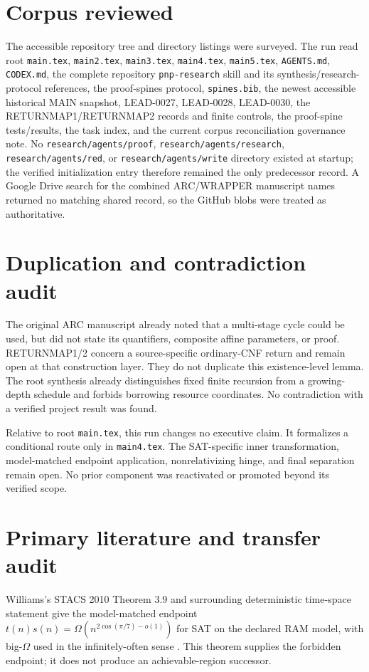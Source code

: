 \documentclass[11pt]{article}
\begin{document}
\section{Corpus reviewed}
The accessible repository tree and directory listings were surveyed. The run
read root \texttt{main.tex}, \texttt{main2.tex}, \texttt{main3.tex},
\texttt{main4.tex}, \texttt{main5.tex}, \texttt{AGENTS.md},
\texttt{CODEX.md}, the complete repository \texttt{pnp-research} skill and its
synthesis/research-protocol references, the proof-spines protocol,
\texttt{spines.bib}, the newest accessible historical MAIN snapshot,
LEAD-0027, LEAD-0028, LEAD-0030, the RETURNMAP1/RETURNMAP2 records and finite
controls, the proof-spine tests/results, the task index, and the current corpus
reconciliation governance note. No \texttt{research/agents/proof},
\texttt{research/agents/research}, \texttt{research/agents/red}, or
\texttt{research/agents/write} directory existed at startup; the verified
initialization entry therefore remained the only predecessor record. A Google
Drive search for the combined ARC/WRAPPER manuscript names returned no
matching shared record, so the GitHub blobs were treated as authoritative.

\section{Duplication and contradiction audit}
The original ARC manuscript already noted that a multi-stage cycle could be
used, but did not state its quantifiers, composite affine parameters, or proof.
RETURNMAP1/2 concern a source-specific ordinary-CNF return and remain open at
that construction layer. They do not duplicate this existence-level lemma.
The root synthesis already distinguishes fixed finite recursion from a
growing-depth schedule and forbids borrowing resource coordinates. No
contradiction with a verified project result was found.

Relative to root \texttt{main.tex}, this run changes no executive claim. It
formalizes a conditional route only in \texttt{main4.tex}. The SAT-specific
inner transformation, model-matched endpoint application, nonrelativizing
hinge, and final separation remain open. No prior component was reactivated or
promoted beyond its verified scope.

\section{Primary literature and transfer audit}
Williams's STACS 2010 Theorem 3.9 and surrounding deterministic
time-space statement give the model-matched endpoint
$t(n)s(n)=\Omega(n^{2\cos(\pi/7)-o(1)})$ for SAT on the declared RAM model,
with big-$\Omega$ used in the infinitely-often sense \cite{williams2010}.
This theorem supplies the forbidden endpoint; it does not produce an
achievable-region successor.
\end{document}
